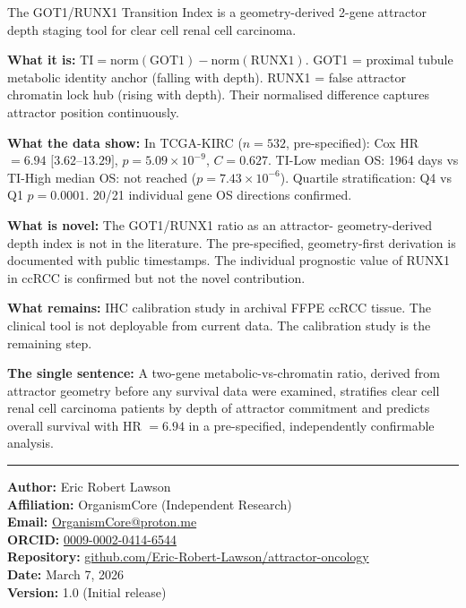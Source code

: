 \documentclass[11pt, a4paper]{article}
\begin{document}
\begin{mdframed}[backgroundcolor=findingbox,
                 linecolor=green!50!black,
                 linewidth=1.5pt]

The GOT1/RUNX1 Transition Index is a
geometry-derived 2-gene attractor depth
staging tool for clear cell renal cell
carcinoma.

\medskip
\textbf{What it is:}
$\text{TI} = \text{norm}(\text{GOT1}) -
\text{norm}(\text{RUNX1})$.
GOT1 = proximal tubule metabolic identity
anchor (falling with depth).
RUNX1 = false attractor chromatin lock
hub (rising with depth).
Their normalised difference captures
attractor position continuously.

\medskip
\textbf{What the data show:}
In TCGA-KIRC ($n = 532$, pre-specified):
Cox HR $= 6.94$ $[3.62$--$13.29]$,
$p = 5.09 \times 10^{-9}$, $C = 0.627$.
TI-Low median OS: 1964 days vs
TI-High median OS: not reached
($p = 7.43 \times 10^{-6}$).
Quartile stratification: Q4 vs Q1
$p = 0.0001$. 20/21 individual gene OS
directions confirmed.

\medskip
\textbf{What is novel:}
The GOT1/RUNX1 ratio as an attractor-
geometry-derived depth index is not in
the literature. The pre-specified,
geometry-first derivation is documented
with public timestamps. The individual
prognostic value of RUNX1 in ccRCC is
confirmed but not the novel contribution.

\medskip
\textbf{What remains:}
IHC calibration study in archival FFPE
ccRCC tissue. The clinical tool is not
deployable from current data.
The calibration study is the remaining step.

\medskip
\textbf{The single sentence:}
A two-gene metabolic-vs-chromatin ratio,
derived from attractor geometry before
any survival data were examined, stratifies
clear cell renal cell carcinoma patients
by depth of attractor commitment and
predicts overall survival with HR $= 6.94$
in a pre-specified, independently
confirmable analysis.

\end{mdframed}

\vspace{1em}
\noindent\rule{\textwidth}{0.4pt}

\noindent\textbf{Author:} Eric Robert Lawson\\
\textbf{Affiliation:} OrganismCore
(Independent Research)\\
\textbf{Email:}
\href{mailto:OrganismCore@proton.me}
{OrganismCore@proton.me}\\
\textbf{ORCID:}
\href{https://orcid.org/0009-0002-0414-6544}
{0009-0002-0414-6544}\\
\textbf{Repository:}
\href{https://github.com/Eric-Robert-Lawson/attractor-oncology}
{github.com/Eric-Robert-Lawson/attractor-oncology}\\
\textbf{Date:} March 7, 2026\\
\textbf{Version:} 1.0 (Initial release)
\end{document}
